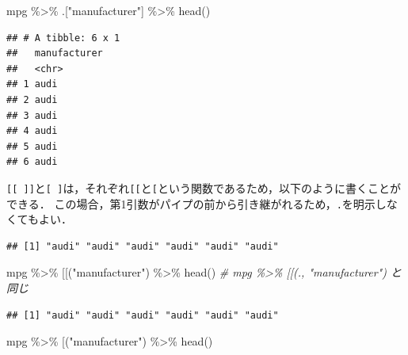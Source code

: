 \documentclass[
]{article}
\newenvironment{Shaded}{\begin{snugshade}}{\end{snugshade}}
\newcommand{\AttributeTok}[1]{\textcolor[rgb]{0.77,0.63,0.00}{#1}}
\newcommand{\CommentTok}[1]{\textcolor[rgb]{0.56,0.35,0.01}{\textit{#1}}}
\newcommand{\FunctionTok}[1]{\textcolor[rgb]{0.00,0.00,0.00}{#1}}
\newcommand{\NormalTok}[1]{#1}
\newcommand{\SpecialCharTok}[1]{\textcolor[rgb]{0.00,0.00,0.00}{#1}}
\newcommand{\StringTok}[1]{\textcolor[rgb]{0.31,0.60,0.02}{#1}}
\begin{document}
\begin{Shaded}
\begin{Highlighting}[]
\NormalTok{mpg }\SpecialCharTok{\%\textgreater{}\%}\NormalTok{ .[}\StringTok{"manufacturer"}\NormalTok{]   }\SpecialCharTok{\%\textgreater{}\%} \FunctionTok{head}\NormalTok{()}
\end{Highlighting}
\end{Shaded}

\begin{verbatim}
## # A tibble: 6 x 1
##   manufacturer
##   <chr>       
## 1 audi        
## 2 audi        
## 3 audi        
## 4 audi        
## 5 audi        
## 6 audi
\end{verbatim}

\texttt{{[}{[}\ {]}{]}}と\texttt{{[}\ {]}}は，それぞれ\texttt{{[}{[}}と\texttt{{[}}という関数であるため，以下のように書くことができる．
この場合，第1引数がパイプの前から引き継がれるため，\texttt{.}を明示しなくてもよい．

\begin{Shaded}
\end{Shaded}

\begin{verbatim}
## [1] "audi" "audi" "audi" "audi" "audi" "audi"
\end{verbatim}

\begin{Shaded}
\begin{Highlighting}[]
\NormalTok{mpg }\SpecialCharTok{\%\textgreater{}\%} \StringTok{\textasciigrave{}}\AttributeTok{[[}\StringTok{\textasciigrave{}}\NormalTok{(}\StringTok{"manufacturer"}\NormalTok{) }\SpecialCharTok{\%\textgreater{}\%} \FunctionTok{head}\NormalTok{() }\CommentTok{\# mpg \%\textgreater{}\% \textasciigrave{}[[\textasciigrave{}(., "manufacturer") と同じ}
\end{Highlighting}
\end{Shaded}

\begin{verbatim}
## [1] "audi" "audi" "audi" "audi" "audi" "audi"
\end{verbatim}

\begin{Shaded}
\begin{Highlighting}[]
\NormalTok{mpg }\SpecialCharTok{\%\textgreater{}\%} \StringTok{\textasciigrave{}}\AttributeTok{[}\StringTok{\textasciigrave{}}\NormalTok{(}\StringTok{"manufacturer"}\NormalTok{)  }\SpecialCharTok{\%\textgreater{}\%} \FunctionTok{head}\NormalTok{()}
\end{Highlighting}
\end{Shaded}
\end{document}
